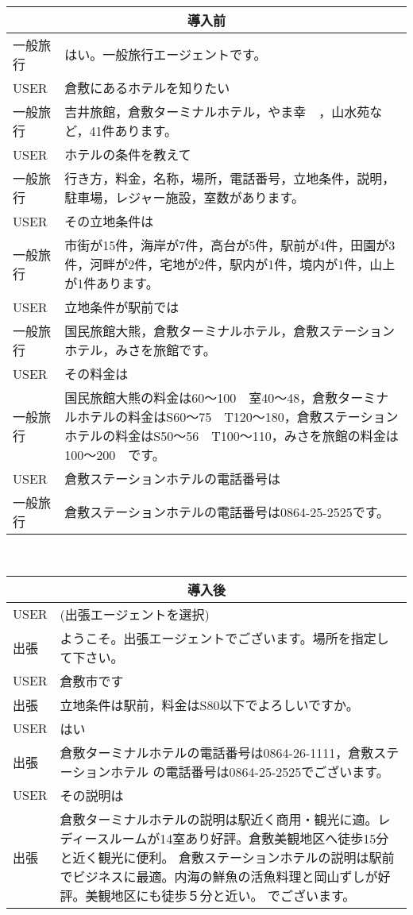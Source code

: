 \begin{table}[htp]
\begin{tabular}[t]{lp{50mm}}
\multicolumn{2}{c}{導入前}\\
\hline\hline
一般旅行&	はい。一般旅行エージェントです。\\
USER&	倉敷にあるホテルを知りたい\\
一般旅行&	吉井旅館，倉敷ターミナルホテル，やま幸　，山水苑など，41件あります。\\
USER&	ホテルの条件を教えて\\
一般旅行&	行き方，料金，名称，場所，電話番号，立地条件，説明，駐車場，レジャー施設，室数があります。\\
USER&	その立地条件は\\
一般旅行&	市街が15件，海岸が7件，高台が5件，駅前が4件，田園が3件，河畔が2件，宅地が2件，駅内が1件，境内が1件，山上が1件あります。\\
USER&	立地条件が駅前では\\
一般旅行&	国民旅館大熊，倉敷ターミナルホテル，倉敷ステーションホテル，みさを旅館です。\\
USER&	その料金は\\
一般旅行&	国民旅館大熊の料金は60〜100　室40〜48，倉敷ターミナルホテルの料金はS60〜75　T120〜180，倉敷ステーションホテルの料金はS50〜56　T100〜110，みさを旅館の料金は100〜200　です。\\
USER&	倉敷ステーションホテルの電話番号は\\
一般旅行&	倉敷ステーションホテルの電話番号は0864-25-2525です。\\
\hline\hline
\end{tabular}　
\begin{tabular}[t]{lp{50mm}}
\multicolumn{2}{c}{導入後}\\
\hline\hline
USER& (出張エージェントを選択)\\
出張&	ようこそ。出張エージェントでございます。場所を指定して下さい。\\
USER& 倉敷市です\\
出張&	立地条件は駅前，料金はS80以下でよろしいですか。\\
USER& はい\\
出張&	倉敷ターミナルホテルの電話番号は0864-26-1111，倉敷ステーションホテル
の電話番号は0864-25-2525でございます。\\
USER&	その説明は\\
出張&	倉敷ターミナルホテルの説明は駅近く商用・観光に適。レディースルームが14室あり好評。倉敷美観地区へ徒歩15分と近く観光に便利。
倉敷ステーションホテルの説明は駅前でビジネスに最適。内海の鮮魚の活魚料理と岡山ずしが好評。美観地区にも徒歩５分と近い。
でございます。\\
\hline\hline
\end{tabular}
\end{table}

